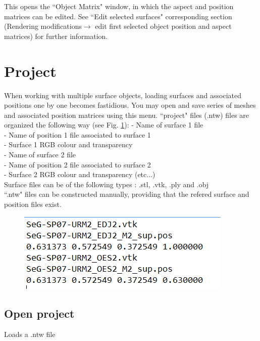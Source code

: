 This opens the ``Object Matrix" window, in which the aspect and position matrices can be edited. See ``Edit selected surfaces" corresponding section (Rendering modifications$\rightarrow$ edit first selected object position and aspect matrices) for further information.


\section{Project}




When working with multiple surface objects,
loading surfaces and associated positions one
by one becomes fastidious. You may open and
save series of meshes and associated position
matrices using this menu.
``project" files (.ntw) files are organized the
following way (see Fig. \ref{project_file}):
- Name of surface 1 file\\
- Name of position 1 file associated to surface 1\\
- Surface 1 RGB colour and transparency\\
- Name of surface 2 file\\
- Name of position 2 file associated to surface 2\\
- Surface 2 RGB colour and transparency (etc...)\\
 


Surface files can be of the following types : .stl, .vtk, .ply and .obj\\
``.ntw" files can be constructed manually, providing that the refered surface and position files exist.



\begin{figure}
  \centering  
 \includegraphics[scale=0.7]{images/File/Ntw.png}
\label{project_file}
\end{figure}

\subsection{Open project}
Loads a .ntw file

